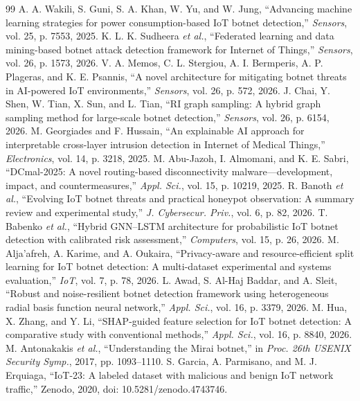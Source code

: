 \begin{thebibliography}{99}
 A. A. Wakili, S. Guni, S. A. Khan, W. Yu, and W. Jung, ``Advancing machine learning strategies for power consumption-based IoT botnet detection,'' \textit{Sensors}, vol. 25, p. 7553, 2025.
 K. L. K. Sudheera \textit{et al.}, ``Federated learning and data mining-based botnet attack detection framework for Internet of Things,'' \textit{Sensors}, vol. 26, p. 1573, 2026.
 V. A. Memos, C. L. Stergiou, A. I. Bermperis, A. P. Plageras, and K. E. Psannis, ``A novel architecture for mitigating botnet threats in AI-powered IoT environments,'' \textit{Sensors}, vol. 26, p. 572, 2026.
 J. Chai, Y. Shen, W. Tian, X. Sun, and L. Tian, ``RI graph sampling: A hybrid graph sampling method for large-scale botnet detection,'' \textit{Sensors}, vol. 26, p. 6154, 2026.
 M. Georgiades and F. Hussain, ``An explainable AI approach for interpretable cross-layer intrusion detection in Internet of Medical Things,'' \textit{Electronics}, vol. 14, p. 3218, 2025.
 M. Abu-Jazoh, I. Almomani, and K. E. Sabri, ``DCmal-2025: A novel routing-based disconnectivity malware---development, impact, and countermeasures,'' \textit{Appl. Sci.}, vol. 15, p. 10219, 2025.
 R. Banoth \textit{et al.}, ``Evolving IoT botnet threats and practical honeypot observation: A summary review and experimental study,'' \textit{J. Cybersecur. Priv.}, vol. 6, p. 82, 2026.
 T. Babenko \textit{et al.}, ``Hybrid GNN--LSTM architecture for probabilistic IoT botnet detection with calibrated risk assessment,'' \textit{Computers}, vol. 15, p. 26, 2026.
 M. Alja'afreh, A. Karime, and A. Oukaira, ``Privacy-aware and resource-efficient split learning for IoT botnet detection: A multi-dataset experimental and systems evaluation,'' \textit{IoT}, vol. 7, p. 78, 2026.
 L. Awad, S. Al-Haj Baddar, and A. Sleit, ``Robust and noise-resilient botnet detection framework using heterogeneous radial basis function neural network,'' \textit{Appl. Sci.}, vol. 16, p. 3379, 2026.
 M. Hua, X. Zhang, and Y. Li, ``SHAP-guided feature selection for IoT botnet detection: A comparative study with conventional methods,'' \textit{Appl. Sci.}, vol. 16, p. 8840, 2026.
 M. Antonakakis \textit{et al.}, ``Understanding the Mirai botnet,'' in \textit{Proc. 26th USENIX Security Symp.}, 2017, pp. 1093--1110.
 S. Garcia, A. Parmisano, and M. J. Erquiaga, ``IoT-23: A labeled dataset with malicious and benign IoT network traffic,'' Zenodo, 2020, doi: 10.5281/zenodo.4743746.

\end{thebibliography}
